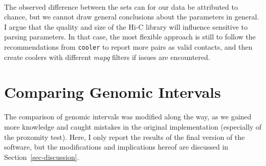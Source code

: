 \documentclass[
  11pt,
  a4paper,
]{scrbook}
\let\origfigure\figure
\let\endorigfigure\endfigure
\renewenvironment{figure}[1][2] {
    \expandafter\origfigure\expandafter[htbp]
} {
    \endorigfigure
}
\begin{document}
\begin{figure}
\begin{minipage}{0.40\linewidth}
{}


\end{minipage}%
%
\begin{minipage}{0.40\linewidth}



\end{minipage}%
%
\begin{minipage}{0.10\linewidth}
~\end{minipage}%

\caption{\label{fig-rs-fb-100-pe-recpe-intervals}Round Spermatid (RS)
and Fibroblast (Fb) at 100kb, comparing the impact of parsing parameters
on A-compartment calling at different viewframes; \emph{arms},
\emph{10Mb}. PE: initial parse (masking complex walks); recPE:
recommended parse (reporting the 5'most unique alignment of a complex
walk).}

\end{figure}%

The observed difference between the sets can for our data be attributed
to chance, but we cannot draw general conclusions about the parameters
in general. I argue that the quality and size of the Hi-C library will
influence sensitive to parsing parameters. In that case, the most
flexible approach is still to follow the recommendations from
\texttt{cooler} to report more pairs as valid contacts, and then create
coolers with different \emph{mapq} filters if issues are encountered.

\section{Comparing Genomic Intervals}\label{comparing-genomic-intervals}

The comparison of genomic intervals was modified along the way, as we
gained more knowledge and caught mistakes in the original implementation
(especially of the proxomity test). Here, I only report the results of
the final version of the software, but the modifications and
implications hereof are discussed in Section~\ref{sec-discussion}.
\end{document}
